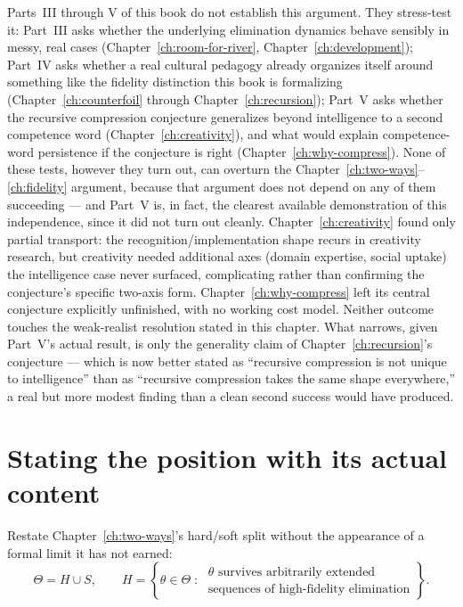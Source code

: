 Parts~III through V of this book do not establish this argument. They stress-test it: Part~III asks whether the underlying elimination dynamics behave sensibly in messy, real cases (Chapter~\ref{ch:room-for-river}, Chapter~\ref{ch:development}); Part~IV asks whether a real cultural pedagogy already organizes itself around something like the fidelity distinction this book is formalizing (Chapter~\ref{ch:counterfoil} through Chapter~\ref{ch:recursion}); Part~V asks whether the recursive compression conjecture generalizes beyond intelligence to a second competence word (Chapter~\ref{ch:creativity}), and what would explain competence-word persistence if the conjecture is right (Chapter~\ref{ch:why-compress}). None of these tests, however they turn out, can overturn the Chapter~\ref{ch:two-ways}--\ref{ch:fidelity} argument, because that argument does not depend on any of them succeeding --- and Part~V is, in fact, the clearest available demonstration of this independence, since it did not turn out cleanly. Chapter~\ref{ch:creativity} found only partial transport: the recognition/implementation shape recurs in creativity research, but creativity needed additional axes (domain expertise, social uptake) the intelligence case never surfaced, complicating rather than confirming the conjecture's specific two-axis form. Chapter~\ref{ch:why-compress} left its central conjecture explicitly unfinished, with no working cost model. Neither outcome touches the weak-realist resolution stated in this chapter. What narrows, given Part~V's actual result, is only the generality claim of Chapter~\ref{ch:recursion}'s conjecture --- which is now better stated as ``recursive compression is not unique to intelligence'' than as ``recursive compression takes the same shape everywhere,'' a real but more modest finding than a clean second success would have produced.

\section{Stating the position with its actual content}

\begin{definition}
Restate Chapter~\ref{ch:two-ways}'s hard/soft split without the appearance of a formal limit it has not earned:
\[
\Theta = H \cup S, \qquad H = \left\{\theta \in \Theta \;:\; \begin{array}{l}\theta\text{ survives arbitrarily extended}\\ \text{sequences of high-fidelity elimination}\end{array}\right\}.
\]
\end{definition}

